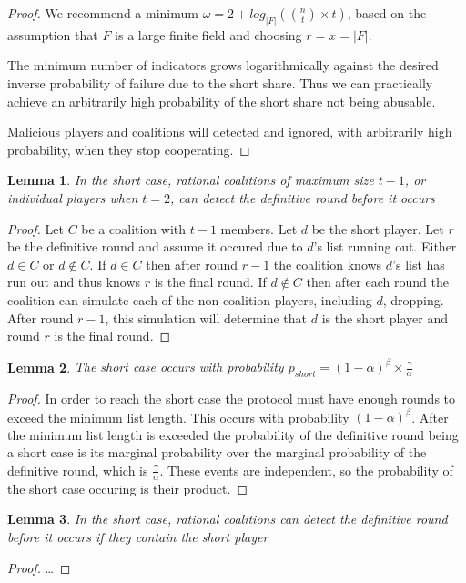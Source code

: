 \documentclass{dalcsthesis}
\newtheorem{lemma}{Lemma}
\begin{document}
\begin{proof}
We recommend a minimum $\omega = 2 + log_{|F|} ({n \choose t} \times t)$, based on the assumption that $F$ is a large finite field and choosing $r = x = |F|$.

The minimum number of indicators grows logarithmically against the desired inverse probability of failure due to the short share. Thus we can practically achieve an arbitrarily high probability of the short share not being abusable.

Malicious players and coalitions will detected and ignored, with arbitrarily high probability, when they stop cooperating.
\end{proof}

\begin{lemma} In the short case, rational coalitions of maximum size $t-1$, or individual players when $t=2$, can detect the definitive round before it occurs \end{lemma}
\begin{proof}
Let $C$ be a coalition with $t-1$ members. Let $d$ be the short player. Let $r$ be the definitive round and assume it occured due to $d$'s list running out. Either $d \in C$ or $d \notin C$. If $d \in C$ then after round $r-1$ the coalition knows $d$'s list has run out and thus knows $r$ is the final round. If $d \notin C$ then after each round the coalition can simulate each of the non-coalition players, including $d$, dropping. After round $r-1$, this simulation will determine that $d$ is the short player and round $r$ is the final round.
\end{proof}

\begin{lemma} The short case occurs with probability $p_{short} = (1-\alpha)^\beta \times \frac{\gamma}{\alpha}$ \end{lemma}
\begin{proof}
In order to reach the short case the protocol must have enough rounds to exceed the minimum list length. This occurs with probability $(1-\alpha)^\beta$. After the minimum list length is exceeded the probability of the definitive round being a short case is its marginal probability over the marginal probability of the definitive round, which is $\frac{\gamma}{\alpha}$. These events are independent, so the probability of the short case occuring is their product.
\end{proof}

\begin{lemma} In the short case, rational coalitions can detect the definitive round before it occurs if they contain the short player\end{lemma}
\begin{proof}
\ldots
\end{proof}
\end{document}
